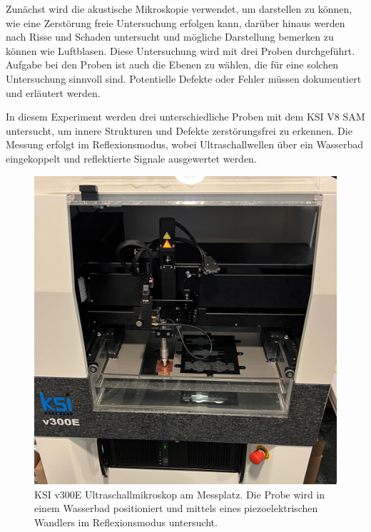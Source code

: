 Zunächst wird die akustische Mikroskopie verwendet, um darstellen zu können, wie eine Zerstörung freie Untersuchung erfolgen kann, darüber hinaus werden nach Risse und Schaden untersucht und mögliche Darstellung bemerken zu können wie Luftblasen. Diese Untersuchung wird mit drei Proben durchgeführt.
Aufgabe bei den Proben ist auch die Ebenen zu wählen, die für eine solchen Untersuchung sinnvoll sind.  Potentielle
Defekte oder Fehler müssen dokumentiert und erläutert werden.


In diesem Experiment werden drei unterschiedliche Proben mit dem KSI V8 SAM untersucht, um innere Strukturen und Defekte zerstörungsfrei zu erkennen. Die Messung erfolgt im Reflexionsmodus, wobei Ultraschallwellen über ein Wasserbad eingekoppelt und reflektierte Signale ausgewertet werden.
\begin{figure}[htbp]
    \centering
    \includegraphics[scale=0.11]{Bilder/ksiv8}
    \caption{KSI v300E Ultraschallmikroskop am Messplatz. Die Probe wird in einem Wasserbad positioniert und mittels eines piezoelektrischen Wandlers im Reflexionsmodus untersucht.}
    \vspace{0.2cm}
    \label{Abb.2: KSI v300E Ultraschallmikroskop am Messplatz. Die Probe wird in einem Wasserbad positioniert und mittels eines piezoelektrischen Wandlers im Reflexionsmodus untersucht. }
\end{figure} 
\vspace{0.2cm}

